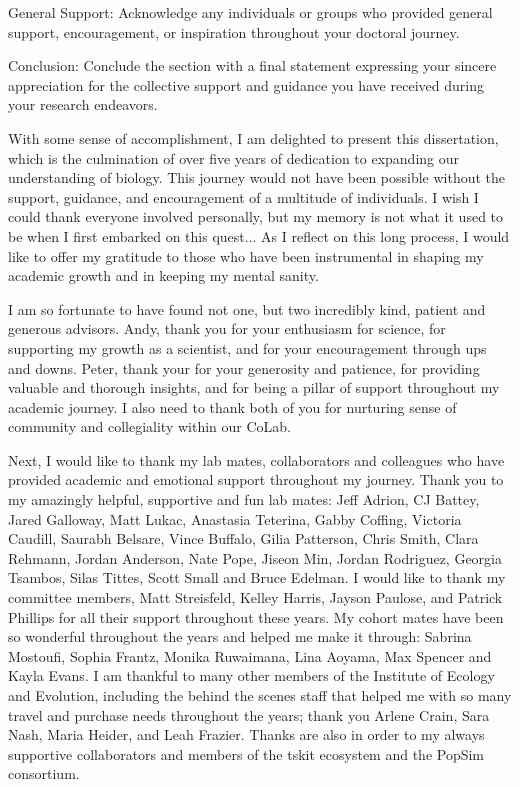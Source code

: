 {General Support: Acknowledge any individuals or groups who provided general support, encouragement, or inspiration throughout your doctoral journey.

Conclusion: Conclude the section with a final statement expressing your sincere appreciation for the collective support and guidance you have received during your research endeavors.

With some sense of accomplishment,
I am delighted to present this dissertation, which is the culmination of over five years of dedication to expanding our understanding of biology.
This journey would not have been possible without the support, guidance, and encouragement of a multitude of individuals.
I wish I could thank everyone involved personally, but my memory is not what it used to be when I first embarked on this quest...
As I reflect on this long process, 
I would like to offer my gratitude to those who have been instrumental in shaping my academic growth and in keeping my mental sanity.

I am so fortunate to have found not one, but two incredibly kind, patient and generous advisors.
Andy, thank you for your enthusiasm for science, for supporting my growth as a scientist, and for your encouragement through ups and downs.
Peter, thank your for your generosity and patience, for providing valuable and thorough insights, and for being a pillar of support throughout my academic journey.
I also need to thank both of you for nurturing sense of community and collegiality within our CoLab.

Next, I would like to thank my lab mates, collaborators and colleagues who have provided academic and emotional support throughout my journey.
Thank you to my amazingly helpful, supportive and fun lab mates: Jeff Adrion, CJ Battey, Jared Galloway, Matt Lukac, Anastasia Teterina, Gabby Coffing, Victoria Caudill, Saurabh Belsare, Vince Buffalo, Gilia Patterson, Chris Smith, Clara Rehmann, Jordan Anderson, Nate Pope, Jiseon Min, Jordan Rodriguez, Georgia Tsambos, Silas Tittes, Scott Small and Bruce Edelman.
I would like to thank my committee members, Matt Streisfeld, Kelley Harris, Jayson Paulose, and Patrick Phillips for all their support throughout these years.
My cohort mates have been so wonderful throughout the years and helped me make it through: Sabrina Mostoufi, Sophia Frantz, Monika Ruwaimana, Lina Aoyama, Max Spencer and Kayla Evans. 
I am thankful to many other members of the Institute of Ecology and Evolution, including the behind the scenes staff that helped me with so many travel and purchase needs throughout the years;
thank you Arlene Crain, Sara Nash, Maria Heider, and Leah Frazier.
Thanks are also in order to my always supportive collaborators and members of the tskit ecosystem and the PopSim consortium.

}
